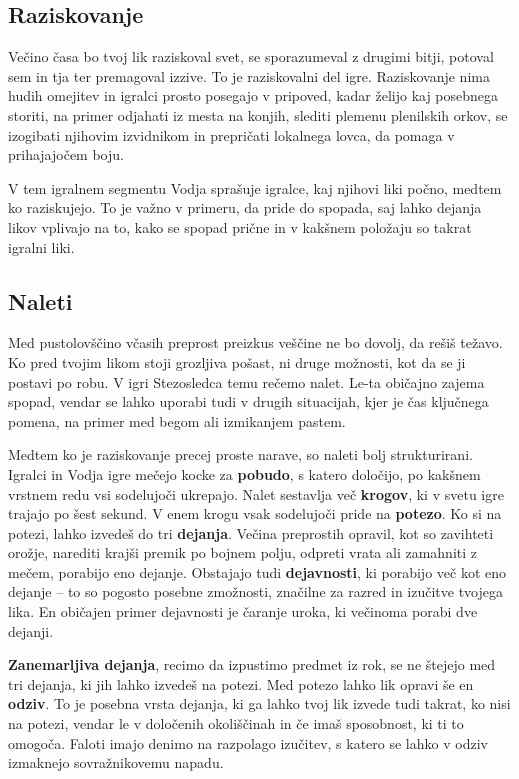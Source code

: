 \subsection{Raziskovanje}
Večino časa bo tvoj lik raziskoval svet, se sporazumeval z drugimi bitji, potoval sem in tja ter premagoval izzive. To je raziskovalni del igre. Raziskovanje nima hudih omejitev in igralci prosto posegajo v pripoved, kadar želijo kaj posebnega storiti, na primer odjahati iz mesta na konjih, slediti plemenu plenilskih orkov, se izogibati njihovim izvidnikom in prepričati lokalnega lovca, da pomaga v prihajajočem boju.

V tem igralnem segmentu Vodja sprašuje igralce, kaj njihovi liki počno, medtem ko raziskujejo. To je važno v primeru, da pride do spopada, saj lahko dejanja likov vplivajo na to, kako se spopad prične in v kakšnem položaju so takrat igralni liki.

\subsection{Naleti}
Med pustolovščino včasih preprost preizkus veščine ne bo dovolj, da rešiš težavo. Ko pred tvojim likom stoji grozljiva pošast, ni druge možnosti, kot da se ji postavi po robu. V igri Stezosledca temu rečemo nalet. Le-ta običajno zajema spopad, vendar se lahko uporabi tudi v drugih situacijah, kjer je čas ključnega pomena, na primer med begom ali izmikanjem pastem.

Medtem ko je raziskovanje precej proste narave, so naleti bolj strukturirani. Igralci in Vodja igre mečejo kocke za \textbf{pobudo}, s katero določijo, po kakšnem vrstnem redu vsi sodelujoči ukrepajo. Nalet sestavlja več \textbf{krogov}, ki v svetu igre trajajo po šest sekund. V enem krogu vsak sodelujoči pride na \textbf{potezo}. Ko si na potezi, lahko izvedeš do tri \textbf{dejanja}. Večina preprostih opravil, kot so zavihteti orožje, narediti krajši premik po bojnem polju, odpreti vrata ali zamahniti z mečem, porabijo eno dejanje. Obstajajo tudi \textbf{dejavnosti}, ki porabijo več kot eno dejanje -- to so pogosto posebne zmožnosti, značilne za razred in izučitve tvojega lika. En običajen primer dejavnosti je čaranje uroka, ki večinoma porabi dve dejanji.

\textbf{Zanemarljiva dejanja}, recimo da izpustimo predmet iz rok, se ne štejejo med tri dejanja, ki jih lahko izvedeš na potezi. Med potezo lahko lik opravi še en \textbf{odziv}. To je posebna vrsta dejanja, ki ga lahko tvoj lik izvede tudi takrat, ko nisi na potezi, vendar le v določenih okoliščinah in če imaš sposobnost, ki ti to omogoča. Faloti imajo denimo na razpolago izučitev, s katero se lahko v odziv izmaknejo sovražnikovemu napadu.

